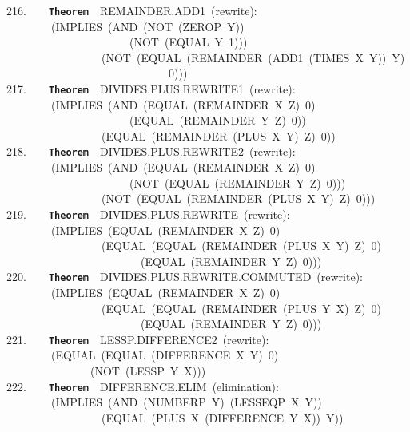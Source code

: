 \documentclass[11pt]{book}
\newenvironment{pubasis}{\begin{flushleft}\ttfamily\small}{\normalsize\rmfamily\end{flushleft}}
\newcommand{\axiomordefinition}[1]{\vspace{6pt}\texttt{\textbf{#1}}}
\begin{document}
\begin{pubasis}
216.~~~~\axiomordefinition{Theorem}~~REMAINDER.ADD1~(rewrite):\\
~~~~~~~~(IMPLIES~(AND~(NOT~(ZEROP~Y))\\
~~~~~~~~~~~~~~~~~~~~~~(NOT~(EQUAL~Y~1)))\\
~~~~~~~~~~~~~~~~~(NOT~(EQUAL~(REMAINDER~(ADD1~(TIMES~X~Y))~Y)\\
~~~~~~~~~~~~~~~~~~~~~~~~~~~~~0)))\\

217.~~~~\axiomordefinition{Theorem}~~DIVIDES.PLUS.REWRITE1~(rewrite):\\
~~~~~~~~(IMPLIES~(AND~(EQUAL~(REMAINDER~X~Z)~0)\\
~~~~~~~~~~~~~~~~~~~~~~(EQUAL~(REMAINDER~Y~Z)~0))\\
~~~~~~~~~~~~~~~~~(EQUAL~(REMAINDER~(PLUS~X~Y)~Z)~0))\\

218.~~~~\axiomordefinition{Theorem}~~DIVIDES.PLUS.REWRITE2~(rewrite):\\
~~~~~~~~(IMPLIES~(AND~(EQUAL~(REMAINDER~X~Z)~0)\\
~~~~~~~~~~~~~~~~~~~~~~(NOT~(EQUAL~(REMAINDER~Y~Z)~0)))\\
~~~~~~~~~~~~~~~~~(NOT~(EQUAL~(REMAINDER~(PLUS~X~Y)~Z)~0)))\\

219.~~~~\axiomordefinition{Theorem}~~DIVIDES.PLUS.REWRITE~(rewrite):\\
~~~~~~~~(IMPLIES~(EQUAL~(REMAINDER~X~Z)~0)\\
~~~~~~~~~~~~~~~~~(EQUAL~(EQUAL~(REMAINDER~(PLUS~X~Y)~Z)~0)\\
~~~~~~~~~~~~~~~~~~~~~~~~(EQUAL~(REMAINDER~Y~Z)~0)))\\

220.~~~~\axiomordefinition{Theorem}~~DIVIDES.PLUS.REWRITE.COMMUTED~(rewrite):\\
~~~~~~~~(IMPLIES~(EQUAL~(REMAINDER~X~Z)~0)\\
~~~~~~~~~~~~~~~~~(EQUAL~(EQUAL~(REMAINDER~(PLUS~Y~X)~Z)~0)\\
~~~~~~~~~~~~~~~~~~~~~~~~(EQUAL~(REMAINDER~Y~Z)~0)))\\

221.~~~~\axiomordefinition{Theorem}~~LESSP.DIF\-FER\-ENCE2~(rewrite):\\
~~~~~~~~(EQUAL~(EQUAL~(DIFFERENCE~X~Y)~0)\\
~~~~~~~~~~~~~~~(NOT~(LESSP~Y~X)))\\

222.~~~~\axiomordefinition{Theorem}~~DIF\-FER\-ENCE.ELIM~(elimination):\\
~~~~~~~~(IMPLIES~(AND~(NUMBERP~Y)~(LESSEQP~X~Y))\\
~~~~~~~~~~~~~~~~~(EQUAL~(PLUS~X~(DIFFERENCE~Y~X))~Y))\\


\end{pubasis}
\end{document}
